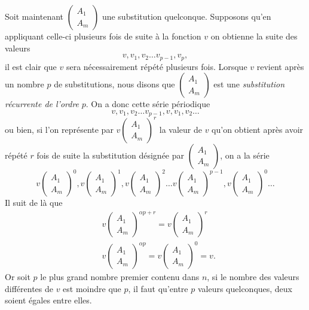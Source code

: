 \documentclass[oneside, 12 pt, leqno]{memoir}
\begin{document}
Soit maintenant \(\left(\begin{array}{c}A_1 \\ A_m\end{array}\right)\) une substitution quelconque. Supposons qu'en appliquant celle-ci plusieurs fois de suite à la fonction \(v\) on obtienne la suite des valeurs
\[v, v_1, v_2 \dots v_{p-1}, v_p,\]
il est clair que \(v\) sera nécessairement répété plusieurs fois. Lorsque \(v\) revient après un nombre \(p\) de substitutions, nous disons que \(\left(\begin{array}{l}A_1 \\ A_m\end{array}\right)\) est une \textit{substitution récurrente de l'ordre} \(p\). On a donc cette série périodique
\[v, v_1, v_2 \dots v_{p-1}, v, v_1, v_2 \dots\]
ou bien, si l'on représente par \(v\left(\begin{array}{l}A_1 \\ A_m\end{array}\right)^r\) la valeur de \(v\) qu'on obtient après 
avoir répété \(r\) fois de suite la substitution désignée par \(\left(\begin{array}{l}A_1 \\ A_m\end{array}\right)\), on a la série
\[v\left(\begin{array}{l}A_1 \\A_m\end{array}\right)^0, v\left(\begin{array}{l}A_1 \\A_m\end{array}\right)^1, v\left(\begin{array}{l}A_1 \\A_m\end{array}\right)^2 \dots v\left(\begin{array}{l}A_1 \\A_m\end{array}\right)^{p-1}, v\left(\begin{array}{l}A_1 \\A_m\end{array}\right)^0 \dots\]
Il suit de là que
\[\begin{aligned}
& v\left(\begin{array}{l}A_1 \\A_m\end{array}\right)^{\alpha p+r}=v\left(\begin{array}{l}A_1 \\A_m\end{array}\right)^r \\
& v\left(\begin{array}{l}A_1 \\A_m\end{array}\right)^{\alpha p}=v\left(\begin{array}{l}A_1 \\A_m\end{array}\right)^0=v.
\end{aligned}\]
Or soit \(p\) le plus grand nombre premier contenu dans \(n\), si le nombre des valeurs différentes de \(v\) est moindre que \(p\), il faut qu'entre \(p\) valeurs quelconques, deux soient égales entre elles.
\end{document}
